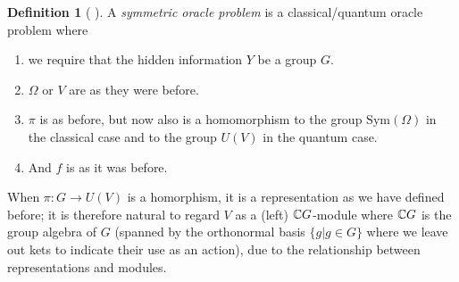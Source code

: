 \documentclass[12pt,twoside]{reedthesis}
\theoremstyle{plain}   %
\theoremstyle{definition}
\newtheorem{defn}{Definition}[section]
\theoremstyle{remark}
\numberwithin{equation}{section}
\def\Sym{\mathrm{Sym}}
\begin{document}
  \begin{defn}[{ \cite[Section 2]{copeland} }]
    A \emph{symmetric oracle problem} is a classical/quantum oracle problem where
    \begin{enumerate}
    \item we require that the hidden information $Y$ be a group $G$.
    \item $\Omega$ or $V$ are as they were before.
    \item $\pi$ is as before, but now also is a homomorphism to the group $\Sym(\Omega)$ in the classical case and to the group $U(V)$ in the quantum case.
    \item And $f$ is as it was before.
    \end{enumerate}
    When $\pi: G \to U(V)$ is a homorphism, it is a representation as we have defined before;
    it is therefore natural to regard $V$ as a (left) $\mathbb{C} G$-module where $\mathbb{C} G$ is the group algebra of $G$ (spanned by the orthonormal basis $\{g | g \in G\}$ where we leave out kets to indicate their use as an action),
    due to the relationship between representations and modules.
  \end{defn}
\end{document}

